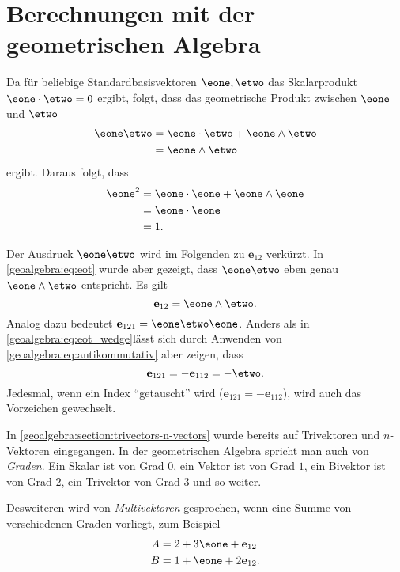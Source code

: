 \newcommand{\eot}{\mathbf{e}_{12}}
\section{Berechnungen mit der geometrischen Algebra}
Da für beliebige Standardbasisvektoren $\eone, \etwo$ das Skalarprodukt $\eone \cdot \etwo = 0$ ergibt,
folgt, dass das geometrische Produkt zwischen $\eone$ und $\etwo$
\begin{equation}
  \begin{aligned}
  \eone \etwo &= \eone \cdot \etwo + \eone \wedge \etwo \\
  &= \eone \wedge \etwo
  \end{aligned}
  \label{geoalgebra:eq:eot}
\end{equation}
ergibt.
Daraus folgt, dass
\begin{equation}
  \begin{aligned}
  \eone^2 &= \eone \cdot \eone + \eone \wedge \eone \\
  &= \eone \cdot \eone \\
  &= 1.
  \end{aligned}
\end{equation}

Der Ausdruck $\eone \etwo$ wird im Folgenden zu $\eot$ verkürzt.
In \eqref{geoalgebra:eq:eot} wurde aber gezeigt, dass $\eone \etwo$ eben
genau $\eone \wedge \etwo$ entspricht. Es gilt
\begin{equation}
  \eot = \eone \wedge \etwo.
  \label{geoalgebra:eq:eot_wedge}
\end{equation}
Analog dazu bedeutet $\mathbf{e}_{121} = \eone \etwo \eone$.
Anders als in \eqref{geoalgebra:eq:eot_wedge}lässt sich durch Anwenden von \eqref{geoalgebra:eq:antikommutativ}
aber zeigen, dass
\begin{equation}
  \mathbf{e}_{121} = - \mathbf{e}_{112} = -\etwo. 
\end{equation}
Jedesmal, wenn ein Index ``getauscht'' wird ($\mathbf{e}_{121} = -\mathbf{e}_{112}$), wird auch das Vorzeichen
gewechselt.

In \autoref{geoalgebra:section:trivectors-n-vectors} wurde bereits auf Trivektoren und $n$-Vektoren eingegangen. 
In der geometrischen Algebra
spricht man auch von \emph{Graden}. Ein Skalar ist von
Grad $0$, ein Vektor ist von Grad $1$, ein Bivektor ist von Grad $2$, ein Trivektor von Grad $3$ und so weiter.

Desweiteren wird von \emph{Multivektoren} gesprochen, wenn eine Summe von verschiedenen Graden vorliegt, zum Beispiel
\begin{align}
A &= 2 + 3 \eone + \eot \\
B &= 1 + \eone + 2 \eot.
\end{align}

